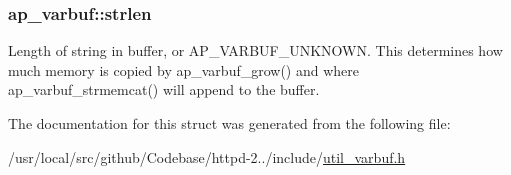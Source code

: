 \subsubsection[{\texorpdfstring{strlen}{strlen}}]{ ap\+\_\+varbuf\+::strlen}\hypertarget{structap__varbuf_a2d592128ff738e2d4d0c5f2afb0d2f83}{}\label{structap__varbuf_a2d592128ff738e2d4d0c5f2afb0d2f83}
Length of string in buffer, or A\+P\+\_\+\+V\+A\+R\+B\+U\+F\+\_\+\+U\+N\+K\+N\+O\+WN. This determines how much memory is copied by ap\+\_\+varbuf\+\_\+grow() and where ap\+\_\+varbuf\+\_\+strmemcat() will append to the buffer. 

The documentation for this struct was generated from the following file\+:\begin{DoxyCompactItemize}
\item 
/usr/local/src/github/\+Codebase/httpd-\/2../include/\hyperlink{util__varbuf_8h}{util\+\_\+varbuf.\+h}\end{DoxyCompactItemize}
